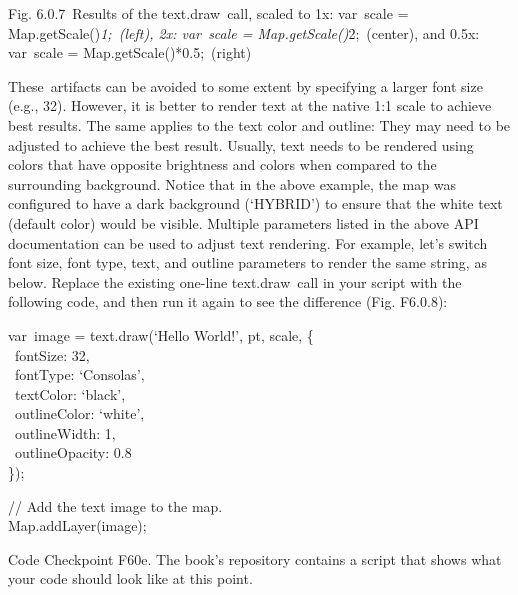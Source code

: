\documentclass[
  letterpaper,
  DIV=11,
  numbers=noendperiod]{scrreprt}
\begin{document}
Fig. 6.0.7~Results of the text.draw~call, scaled to 1x: var~scale =
Map.getScale()\emph{1;~(left), 2x: var~scale =
Map.getScale()}2;~(center), and 0.5x: var~scale =
Map.getScale()*0.5;~(right)

These~artifacts can be avoided to some extent by specifying a larger
font size (e.g., 32). However, it is better to render text at the native
1:1 scale to achieve best results. The same applies to the text color
and outline: They may need to be adjusted to achieve the best result.
Usually, text needs to be rendered using colors that have opposite
brightness and colors when compared to the surrounding background.
Notice that in the above example, the map was configured to have a dark
background (`HYBRID') to ensure that the white text (default color)
would be visible. Multiple parameters listed in the above API
documentation can be used to adjust text rendering. For example, let's
switch font size, font type, text, and outline parameters to render the
same string, as below. Replace the existing one-line text.draw~call in
your script with the following code, and then run it again to see the
difference (Fig. F6.0.8):

var~image = text.draw(`Hello World!', pt, scale, \{\\
\hspace*{0.333em} ~fontSize: 32,\\
\hspace*{0.333em} ~fontType: `Consolas',\\
\hspace*{0.333em} ~textColor: `black',\\
\hspace*{0.333em} ~outlineColor: `white',\\
\hspace*{0.333em} ~outlineWidth: 1,\\
\hspace*{0.333em} ~outlineOpacity: 0.8\\
\});

// Add the text image to the map.\\
Map.addLayer(image);

\begin{tcolorbox}[enhanced jigsaw, left=2mm, breakable, rightrule=.15mm, opacityback=0, colframe=quarto-callout-note-color-frame, colbacktitle=quarto-callout-note-color!10!white, arc=.35mm, opacitybacktitle=0.6, toptitle=1mm, colback=white, leftrule=.75mm, title=\textcolor{quarto-callout-note-color}{\faInfo}\hspace{0.5em}{Note}, toprule=.15mm, bottomtitle=1mm, titlerule=0mm, bottomrule=.15mm, coltitle=black]

Code Checkpoint F60e. The book's repository contains a script that shows
what your code should look like at this point.

\end{tcolorbox}
\end{document}
